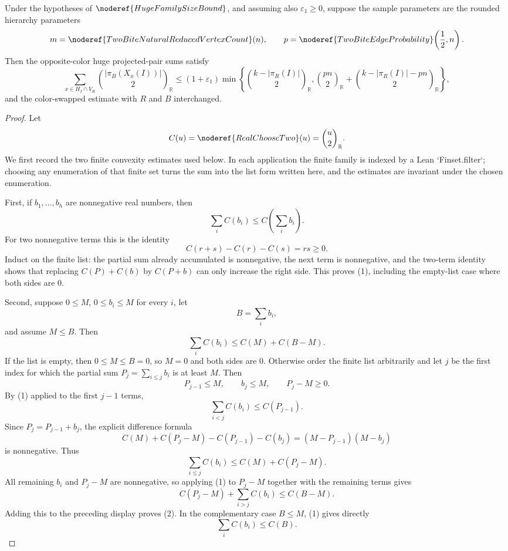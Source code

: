 \begin{lemma}
Under the hypotheses of \(\noderef{HugeFamilySizeBound}\), and assuming also
\(\varepsilon_1\ge0\), suppose the sample parameters are the rounded hierarchy
parameters
\[
m=\noderef{TwoBiteNaturalReducedVertexCount}(n),
\qquad
p=\noderef{TwoBiteEdgeProbability}\!\left(\frac12,n\right).
\]
Then the opposite-color huge projected-pair sums satisfy
\[
\sum_{x\in H_I\cap V_R}\binom{|\pi_B(X_x(I))|}{2}_{\mathbb R}
\le
(1+\varepsilon_1)
\min\left\{
\binom{k-|\pi_R(I)|}{2}_{\mathbb R},
\binom{pn}{2}_{\mathbb R}+
\binom{k-|\pi_R(I)|-pn}{2}_{\mathbb R}
\right\},
\]
and the color-swapped estimate with \(R\) and \(B\) interchanged.
\end{lemma}
\begin{proof}
Let
\[
C(u)=\noderef{RealChooseTwo}(u)=\binom{u}{2}_{\mathbb R}.
\]
We first record the two finite convexity estimates used below.
In each application the finite family is indexed by a Lean `Finset.filter`;
choosing any enumeration of that finite set turns the sum into the list form
written here, and the estimates are invariant under the chosen enumeration.

First, if \(b_1,\ldots,b_h\) are nonnegative real numbers, then
\[
\sum_i C(b_i)\le C\left(\sum_i b_i\right). \tag{1}
\]
For two nonnegative terms this is the identity
\[
C(r+s)-C(r)-C(s)=rs\ge0.
\]
Induct on the finite list: the partial sum already accumulated is
nonnegative, the next term is nonnegative, and the two-term identity shows
that replacing \(C(P)+C(b)\) by \(C(P+b)\) can only increase the right side.
This proves (1), including the empty-list case where both sides are \(0\).

Second, suppose \(0\le M\), \(0\le b_i\le M\) for every \(i\), let
\[
B=\sum_i b_i,
\]
and assume \(M\le B\).  Then
\[
\sum_i C(b_i)\le C(M)+C(B-M). \tag{2}
\]
If the list is empty, then \(0\le M\le B=0\), so \(M=0\) and both sides are
\(0\).  Otherwise
order the finite list arbitrarily and let \(j\) be the first index for which
the partial sum \(P_j=\sum_{i\le j}b_i\) is at least \(M\).  Then
\[
P_{j-1}\le M,\qquad b_j\le M,\qquad P_j-M\ge0.
\]
By (1) applied to the first \(j-1\) terms,
\[
\sum_{i<j}C(b_i)\le C(P_{j-1}).
\]
Since \(P_j=P_{j-1}+b_j\), the explicit difference formula
\[
C(M)+C(P_j-M)-C(P_{j-1})-C(b_j)
  =(M-P_{j-1})(M-b_j)
\]
is nonnegative.  Thus
\[
\sum_{i\le j}C(b_i)\le C(M)+C(P_j-M).
\]
All remaining \(b_i\) and \(P_j-M\) are nonnegative, so applying (1) to
\(P_j-M\) together with the remaining terms gives
\[
C(P_j-M)+\sum_{i>j}C(b_i)
\le C(B-M).
\]
Adding this to the preceding display proves (2).  In the complementary case
\(B\le M\), (1) gives directly
\[
\sum_i C(b_i)\le C(B). \tag{3}
\]


\end{proof}
